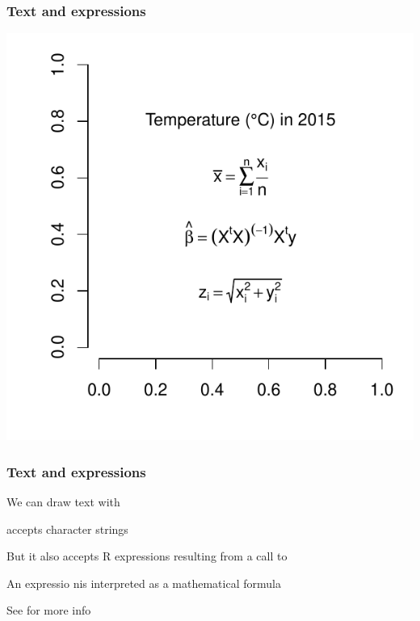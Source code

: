 \documentclass[12pt]{beamer}\usepackage[]{graphicx}\usepackage[]{color}
\newenvironment{knitrout}{}{} %
\begin{document}
\begin{frame}[fragile]
\frametitle{Text and expressions}

\begin{knitrout}\footnotesize
{}\color{fgcolor}

{\centering \includegraphics[width=.8\linewidth,height=.8\linewidth]{figure/formula-1} 

}



\end{knitrout}

\end{frame}


\begin{frame}
\frametitle{Text and expressions}

\bi
  \item We can draw text with 
  \item {} accepts character strings
  \item But it also accepts R expressions resulting from a call to {\hilit {}}
  \item An expressio nis interpreted as a mathematical formula
  \item See  for more info
\ei

\end{frame}

\end{document}
